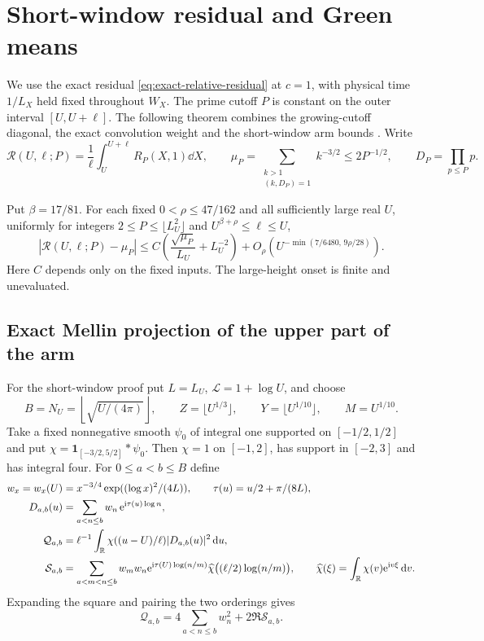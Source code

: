 \section{Short-window residual and Green means}
\label{sec:b10-short-windows}

We use the exact residual \eqref{eq:exact-relative-residual} at \(c=1\),
with physical time \(1/L_X\) held fixed throughout \(W_X\). The prime
cutoff \(P\) is constant on the outer interval \([U,U+\ell]\).
The following theorem combines the growing-cutoff diagonal, the exact
convolution weight and the short-window arm bounds
\cite{GNPRSWeightedEulerLedger,GNPRSLocalizedArm,GNPRSGrowingExponentPair,GNPRSSignedMellin}.
Write
\[
 \mathscr R(U,\ell;P)=\frac1\ell\int_U^{U+\ell}R_P(X,1)\dd X,
 \qquad
 \mu_P=\sum_{\substack{k>1\\(k,D_P)=1}}k^{-3/2}\le2P^{-1/2},
 \qquad D_P=\prod_{p\le P}p .
\]

\begin{theorem}
\label{thm:b10-averaged}
Put \(\beta=17/81\). For each fixed \(0<\rho\le47/162\) and all
sufficiently large real \(U\), uniformly for integers
\(2\le P\le\lfloor L_U^2\rfloor\) and
\(U^{\beta+\rho}\le\ell\le U\),
\begin{equation}\label{eq:b10-main}
 \left|\mathscr R(U,\ell;P)-\mu_P\right|
 \le C\left(\frac{\sqrt{\mu_P}}{L_U}+L_U^{-2}\right)
     +O_\rho\!\left(U^{-\min(7/6480,\,9\rho/28)}\right).
\end{equation}
Here \(C\) depends only on the fixed inputs. The large-height onset
is finite and unevaluated.
\end{theorem}

\subsection{Exact Mellin projection of the upper part of the arm}

For the short-window proof put \(L=L_U\), \(\mathcal L=1+\log U\),
and choose
\[
 B=N_U=\left\lfloor\sqrt{U/(4\pi)}\right\rfloor,\qquad
 Z=\lfloor U^{1/3}\rfloor,\qquad Y=\lfloor U^{1/10}\rfloor,\qquad
 M=U^{1/10}.
\]
Take a fixed nonnegative smooth \(\psi_0\) of integral one supported
on \([-1/2,1/2]\) and put
\(\chi=\mathbf1_{[-3/2,5/2]}*\psi_0\).
Then \(\chi=1\) on \([-1,2]\), has support in \([-2,3]\) and
has integral four. For \(0\le a<b\le B\) define
\begin{align*}
 w_x=w_x(U)&=x^{-3/4}\exp((\log x)^2/(4L)),\qquad
 \tau(u)=u/2+\pi/(8L),\\
 D_{a,b}(u)&=\sum_{a<n\le b}w_n\,\mathrm e^{\mathrm i\tau(u)\log n},\\
 \mathcal Q_{a,b}&=\ell^{-1}\int_\mathbb R
       \chi((u-U)/\ell)|D_{a,b}(u)|^2\,\mathrm d u,\\
 \mathcal S_{a,b}&=\sum_{a<m<n\le b}w_mw_n
       \mathrm e^{\mathrm i\tau(U)\log(n/m)}
       \widehat\chi\bigl((\ell/2)\log(n/m)\bigr),
 \qquad
 \widehat\chi(\xi)=\int_\mathbb R\chi(v)\mathrm e^{\mathrm i v\xi}\,\mathrm d v.
\end{align*}
Expanding the square and pairing the two orderings gives
\begin{equation}\label{eq:b10-signed}
 \mathcal Q_{a,b}=4\sum_{a<n\le b}w_n^2+2\Re\mathcal S_{a,b}.
\end{equation}

